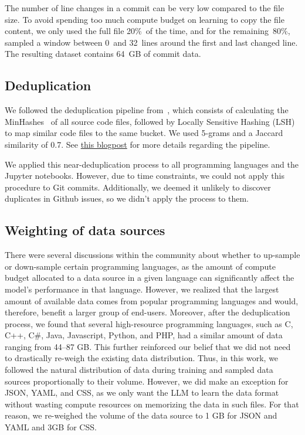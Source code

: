 The number of line changes in a commit can be very low compared to the file size. To avoid spending too much compute budget on learning to copy the file content, we only used the full file 20\%~of the time, and for the remaining~80\%, sampled a window between 0~and 32~lines around the first and last changed line. The resulting dataset contains 64~GB of commit data.

\subsection{Deduplication}
We followed the deduplication pipeline from~\citet{allal2023santacoder}, which consists of calculating the MinHashes~\citep{broder2000identifying} of all source code files, followed by Locally Sensitive Hashing (LSH) to map similar code files to the same bucket. We used 5-grams and a Jaccard similarity of 0.7. See \href{https://chenghaomou.github.io/posts/20230220150602}{this blogpost} for more details regarding the pipeline. 

We applied this near-deduplication process to all programming languages and the Jupyter notebooks. However, due to time constraints, we could not apply this procedure to Git commits. Additionally, we deemed it unlikely to discover duplicates in Github issues, so we didn't apply the process to them. 

\subsection{Weighting of data sources}\label{sec:Weighting}
There were several discussions within the community about whether to up-sample or down-sample certain programming languages, as the amount of compute budget allocated to a data source in a given language can significantly affect the model's performance in that language. However, we realized that the largest amount of available data comes from popular programming languages and would, therefore, benefit a larger group of end-users. Moreover, after the deduplication process, we found that several high-resource programming languages, such as C, C++, C\#, Java, Javascript, Python, and PHP, had a similar amount of data ranging from 44--87 GB. This further reinforced our belief that we did not need to drastically re-weigh the existing data distribution. Thus, in this work, we followed the natural distribution of data during training and sampled data sources proportionally to their volume. However, we did make an exception for JSON, YAML, and CSS, as we only want the LLM to learn the data format without wasting compute resources on memorizing the data in such files. For that reason, we re-weighed the volume of the data source to 1 GB for JSON and YAML and 3GB for CSS.

